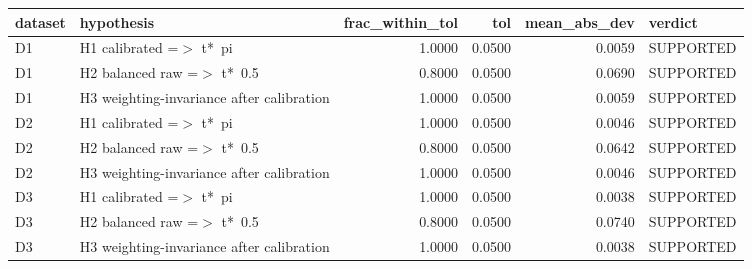 \begin{tabular}{llrrrl}
\toprule
dataset & hypothesis & frac\_within\_tol & tol & mean\_abs\_dev & verdict \\
\midrule
D1 & H1 calibrated =$>$ t*~pi & 1.0000 & 0.0500 & 0.0059 & SUPPORTED \\
D1 & H2 balanced raw =$>$ t*~0.5 & 0.8000 & 0.0500 & 0.0690 & SUPPORTED \\
D1 & H3 weighting-invariance after calibration & 1.0000 & 0.0500 & 0.0059 & SUPPORTED \\
D2 & H1 calibrated =$>$ t*~pi & 1.0000 & 0.0500 & 0.0046 & SUPPORTED \\
D2 & H2 balanced raw =$>$ t*~0.5 & 0.8000 & 0.0500 & 0.0642 & SUPPORTED \\
D2 & H3 weighting-invariance after calibration & 1.0000 & 0.0500 & 0.0046 & SUPPORTED \\
D3 & H1 calibrated =$>$ t*~pi & 1.0000 & 0.0500 & 0.0038 & SUPPORTED \\
D3 & H2 balanced raw =$>$ t*~0.5 & 0.8000 & 0.0500 & 0.0740 & SUPPORTED \\
D3 & H3 weighting-invariance after calibration & 1.0000 & 0.0500 & 0.0038 & SUPPORTED \\
\bottomrule
\end{tabular}
